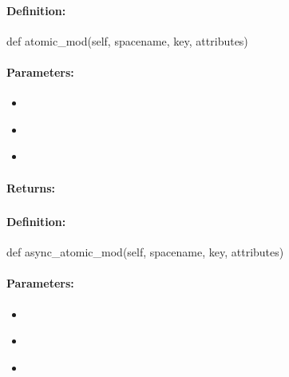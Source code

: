 \paragraph{Definition:}
\begin{pythoncode}
def atomic_mod(self, spacename, key, attributes)
\end{pythoncode}

\paragraph{Parameters:}
\begin{itemize}[noitemsep]
\item {}\\

\item {}\\

\item {}\\

\end{itemize}

\paragraph{Returns:}


\pagebreak
\subsubsection{}
\label{api:python:async_atomic_mod}


\paragraph{Definition:}
\begin{pythoncode}
def async_atomic_mod(self, spacename, key, attributes)
\end{pythoncode}

\paragraph{Parameters:}
\begin{itemize}[noitemsep]
\item {}\\

\item {}\\

\item {}\\

\end{itemize}

